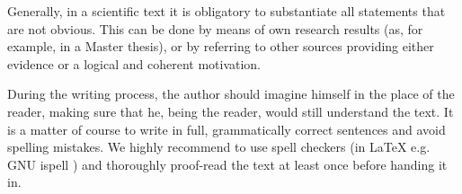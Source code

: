 Generally, in a scientific text it is obligatory to substantiate all statements
that are not obvious. This can be done by means of own research results (as, for
example, in a Master thesis), or by referring to other sources providing either
evidence or a logical and coherent motivation.

During the writing process, the author should imagine himself in the place of the
reader, making sure that he, being the reader, would still understand the text.
It is a matter of course to write in full, grammatically correct sentences and
avoid spelling mistakes. We highly recommend to use spell checkers (in LaTeX e.g.
GNU ispell \cite{ispell_homepage}) and thoroughly proof-read the text at least once
before handing it in.




